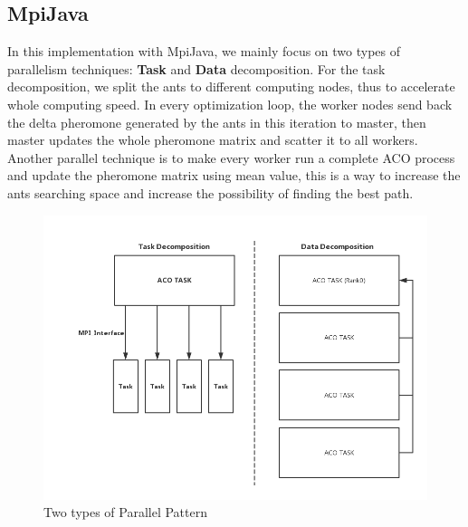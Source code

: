 \documentclass[11pt, letterpaper]{article}
\begin{document}
	\subsection{MpiJava}
		In this implementation with MpiJava, we mainly focus on two types of parallelism techniques: \textbf{Task} and \textbf{Data} decomposition. For the task decomposition, we split the ants to different computing nodes, thus to accelerate whole computing speed. In every optimization loop, the worker nodes send back the delta pheromone generated by the ants in this iteration to master, then master updates the whole pheromone matrix and scatter it to all workers. Another parallel technique is to make every worker run a complete ACO process and update the pheromone matrix using mean value, this is a way to increase the ants searching space and increase the possibility of finding the best path.
	
	\begin{figure}[H]
		\centering
		\includegraphics[width=0.7\linewidth]{parallel}
		\caption{Two types of Parallel Pattern}
		\label{fig:parallel}
	\end{figure}
\end{document}
